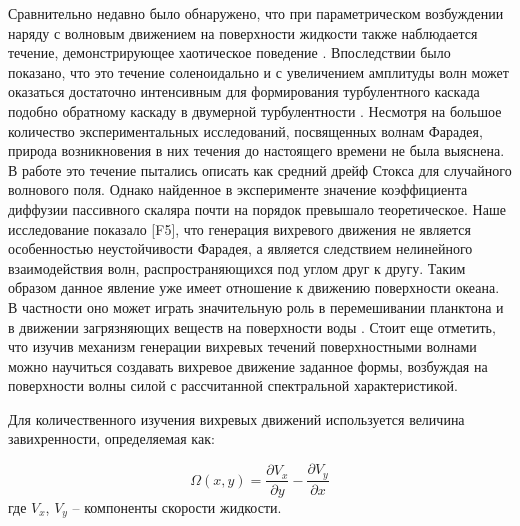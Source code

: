 Сравнительно недавно было обнаружено, что при параметрическом возбуждении  наряду с волновым движением на поверхности жидкости также наблюдается течение, демонстрирующее хаотическое поведение \cite{Ramshankar1990}. Впоследствии было показано, что это течение соленоидально и с увеличением амплитуды волн может оказаться достаточно интенсивным для формирования турбулентного каскада \cite{VonKameke2011, Francois2014, Francois2013} подобно обратному каскаду в двумерной турбулентности \cite{Kraichnan1967}. Несмотря на большое количество экспериментальных исследований, посвященных волнам Фарадея, природа возникновения в них течения до настоящего времени не была выяснена. В работе \cite{Mesquita1992} это течение пытались описать как средний дрейф Стокса \cite{Stokes1847} для случайного волнового поля. Однако найденное в эксперименте значение коэффициента диффузии пассивного скаляра почти на порядок превышало теоретическое.	
	Наше исследование показало [F5], что генерация вихревого движения не является особенностью неустойчивости Фарадея, а является следствием нелинейного взаимодействия волн, распространяющихся под углом друг к другу. Таким образом данное явление уже имеет отношение к движению поверхности океана. В частности оно может играть значительную роль в перемешивании планктона и в движении загрязняющих веществ на поверхности воды \cite{Falkovich2009}.
	Стоит еще отметить, что изучив механизм генерации вихревых течений поверхностными волнами можно научиться создавать вихревое движение заданное формы, возбуждая на поверхности волны силой с  рассчитанной спектральной характеристикой.
	
Для количественного изучения вихревых движений используется величина завихренности, определяемая как:

\begin{equation}
 \label{eq:defVort}
\Omega(x, y) = \frac{\partial V_x}{\partial y} - \frac{\partial V_y}{\partial x}
\end{equation}
где $V_x$, $V_y$ – компоненты скорости жидкости. 







